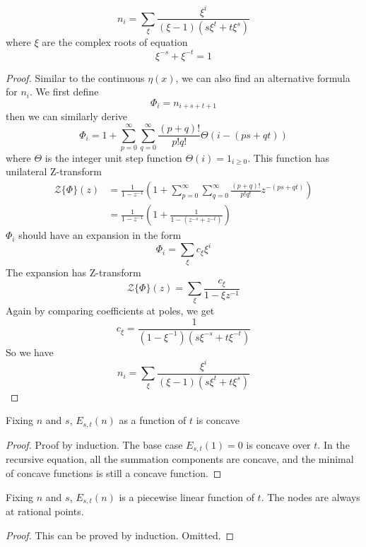 \documentclass[]{article}
\begin{document}
\vspace{1cm}
\begin{lemma}
	\[
	n_i = \sum_{\xi} \frac{\xi^{i}}{(\xi - 1)(s\xi^{t}+t\xi^{s})}
	\]
	where $\xi$ are the complex roots of equation
	\[
	\xi^{-s} + \xi^{-t} = 1
	\]
\end{lemma}
\begin{proof}
Similar to the continuous $\eta(x)$, we can also find an alternative formula for $n_i$. We first define
\[
\Phi_i = n_{i+s+t+1}
\]
then we can similarly derive
\[
\Phi_i = 1 + \sum_{p=0}^{\infty} \sum_{q=0}^{\infty}\frac{(p+q)!}{p!q!} \Theta(i-(ps+qt))
\]
where $\Theta$ is the integer unit step function $\Theta(i) = 1_{i \geq 0}$. This function has unilateral Z-transform
\begin{align*}
\mathcal{Z}\{\Phi\}(z) &= \frac{1}{1-z^{-1}}\left(1 +  \sum_{p=0}^{\infty} \sum_{q=0}^{\infty}\frac{(p+q)!}{p!q!} z^{-(ps+qt)} \right) \\
&= \frac{1}{1-z^{-1}}\left(1 +  \frac{1}{1-(z^{-s} + z^{-t})} \right)
\end{align*}
$\Phi_i$ should have an expansion in the form
\[
\Phi_i = \sum_{\xi} c_{\xi}\xi^i
\]
The expansion has Z-transform
\[
\mathcal{Z}\{\Phi\}(z) = \sum_{\xi} \frac{c_{\xi}}{1-\xi z^{-1}}
\]
Again by comparing coefficients at poles, we get
\[
c_{\xi} = \frac{1}{(1-\xi^{-1})(s\xi^{-s}+t\xi^{-t})}
\]
So we have
\[
n_i = \sum_{\xi} \frac{\xi^{i}}{(\xi - 1)(s\xi^{t}+t\xi^{s})}
\]
\end{proof}

\vspace{1cm}
\begin{lemma}[$s,t$-concavity]
Fixing $n$ and $s$, $E_{s,t}(n)$ as a function of $t$ is concave
\end{lemma}
\begin{proof}
Proof by induction. The base case $E_{s,t}(1) = 0$ is concave over $t$. In the recursive equation, all the summation components are concave, and the minimal of concave functions is still a concave function.
\end{proof}

\vspace{1cm}
\begin{lemma}[$s,t$-linearity]
Fixing $n$ and $s$, $E_{s,t}(n)$ is a piecewise linear function of $t$. The nodes are always at rational points.
\end{lemma}
\begin{proof}
	This can be proved by induction. Omitted.
\end{proof}
\end{document}

